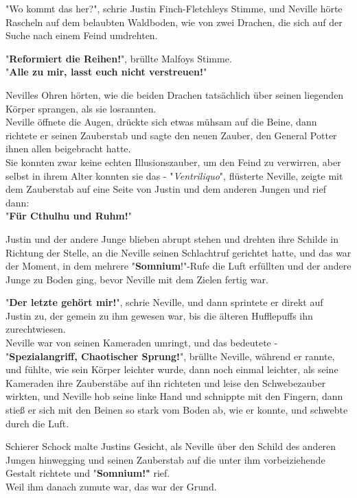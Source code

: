 {"Wo kommt das her?", schrie Justin Finch-Fletchleys Stimme, und Neville hörte Rascheln auf dem belaubten Waldboden, wie von zwei Drachen, die sich auf der Suche nach einem Feind umdrehten.

"\textbf{Reformiert die Reihen!}", brüllte Malfoys Stimme.\\ "\textbf{Alle zu mir, lasst euch nicht verstreuen!}"

Nevilles Ohren hörten, wie die beiden Drachen tatsächlich über seinen liegenden Körper sprangen, als sie losrannten.\\ Neville öffnete die Augen, drückte sich etwas mühsam auf die Beine, dann richtete er seinen Zauberstab und sagte den neuen Zauber, den General Potter ihnen allen beigebracht hatte.\\ Sie konnten zwar keine echten Illusionszauber, um den Feind zu verwirren, aber selbst in ihrem Alter konnten sie das - "\emph{Ventriliquo}", flüsterte Neville, zeigte mit dem Zauberstab auf eine Seite von Justin und dem anderen Jungen und rief dann:\\ "\textbf{Für Cthulhu und Ruhm!}"

Justin und der andere Junge blieben abrupt stehen und drehten ihre Schilde in Richtung der Stelle, an die Neville seinen Schlachtruf gerichtet hatte, und das war der Moment, in dem mehrere "\textbf{Somnium}!"-Rufe die Luft erfüllten und der andere Junge zu Boden ging, bevor Neville mit dem Zielen fertig war.

"\textbf{Der letzte gehört mir!}", schrie Neville, und dann sprintete er direkt auf Justin zu, der gemein zu ihm gewesen war, bis die älteren Hufflepuffs ihn zurechtwiesen.\\ Neville war von seinen Kameraden umringt, und das bedeutete -\\ "\textbf{Spezialangriff, Chaotischer Sprung!}", brüllte Neville, während er rannte, und fühlte, wie sein Körper leichter wurde, dann noch einmal leichter, als seine Kameraden ihre Zauberstäbe auf ihn richteten und leise den Schwebezauber wirkten, und Neville hob seine linke Hand und schnippte mit den Fingern, dann stieß er sich mit den Beinen so stark vom Boden ab, wie er konnte, und schwebte durch die Luft.

Schierer Schock malte Justins Gesicht, als Neville über den Schild des anderen Jungen hinwegging und seinen Zauberstab auf die unter ihm vorbeiziehende Gestalt richtete und "\textbf{Somnium!"} rief.\\ Weil ihm danach zumute war, das war der Grund.

}

